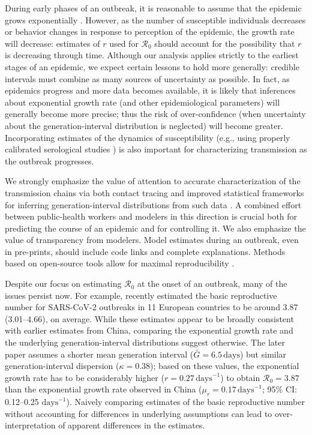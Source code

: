 \documentclass[12pt]{article}
\newcommand{\Ro}{\ensuremath{{\mathcal R}_{0}}\xspace}
\begin{document}
During early phases of an outbreak, it is reasonable to assume that the epidemic grows exponentially \citep{anderson1991infectious}.
However, as the number of susceptible individuals decreases or behavior changes in response to perception of the epidemic, the growth rate will decrease: estimates of $r$ used for \Ro should account for the possibility that $r$ is decreasing through time.
Although our analysis applies strictly to the earliest stages of an epidemic, we expect certain lessons to hold more generally: credible intervals must combine as many sources of uncertainty as possible. 
In fact, as epidemics progress and more data becomes available, it is likely that inferences about exponential growth rate (and other epidemiological parameters) will generally become more precise; thus the risk of over-confidence (when uncertainty about the generation-interval distribution is neglected) will become greater.
Incorporating estimates of the dynamics of susceptibility (e.g., using properly calibrated serological studies \citep{metcalf2016use}) is also important for characterizing transmission as the outbreak progresses.

We strongly emphasize the value of attention to accurate characterization of the transmission chains via both contact tracing and improved statistical frameworks for inferring generation-interval distributions from such data \citep{britton2019estimation}.
A combined effort between public-health workers and modelers in this direction is crucial both for predicting the course of an epidemic and for controlling it.
We also emphasize the value of transparency from modelers.
Model estimates during an outbreak, even in pre-prints, should include code links and complete explanations.
Methods based on open-source tools allow for maximal reproducibility \citep{barton2020call}.

Despite our focus on estimating \Ro at the onset of an outbreak, many of the issues persist now. 
For example, \cite{flaxman2020estimating} recently estimated the basic reproductive number for SARS-CoV-2 outbreaks in 11 European countries to be around 3.87 (3.01--4.66), on average.
While these estimates appear to be broadly consistent with earlier estimates from China, comparing the exponential growth rate and the underlying generation-interval distributions suggest otherwise.
The later paper assumes a shorter mean generation interval ($\bar G = 6.5\,\textrm{days}$) but similar generation-interval dispersion ($\kappa = 0.38$);
based on these values, the exponential growth rate has to be considerably higher ($r = 0.27\,\textrm{days}^{-1}$) to obtain $\Ro = 3.87$ than the exponential growth rate observed in China ($\mu_r = 0.17\,\textrm{days}^{-1}$; 95\% CI: 0.12--0.25 $\textrm{days}^{-1}$).
Naively comparing estimates of the basic reproductive number without accounting for differences in underlying assumptions can lead to over-interpretation of apparent differences in the estimates.
\end{document}
